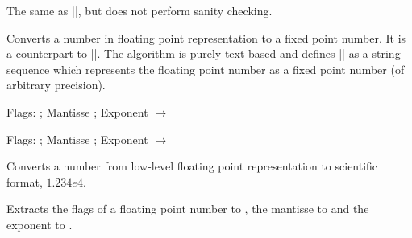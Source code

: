 \begin{command}{\pgfmathfloatqparsenumber{}}
	The same as |\pgfmathfloatparsenumber|, but does not perform sanity checking.
\end{command}

\begin{command}{}
	Converts a number in floating point representation to a fixed point number. It is a counterpart to |\pgfmathfloatparsenumber|. The algorithm is purely text based and defines |\pgfmathresult| as a string sequence which represents the floating point number  as a fixed point number (of arbitrary precision).

\begin{codeexample}[]
\pgfmathfloattomacro{\pgfmathresult}{\F}{\M}{\E}
Flags: \F; Mantisse \M; Exponent \E
$\to$ 
\pgfmathfloattofixed{\pgfmathresult}
\pgfmathresult
\end{codeexample}

\begin{codeexample}[]
\pgfmathfloattomacro{\pgfmathresult}{\F}{\M}{\E}
Flags: \F; Mantisse \M; Exponent \E
$\to$
\pgfmathfloattofixed{\pgfmathresult}
\pgfmathresult 
\end{codeexample}
\end{command}

\begin{command}{\pgfmathfloattosci{}}
	Converts a number from low-level floating point representation to scientific format, $1.234e4$.
\end{command}


\begin{command}{}
	Extracts the flags of a floating point number  to , the mantisse to  and the exponent to .
\end{command}

